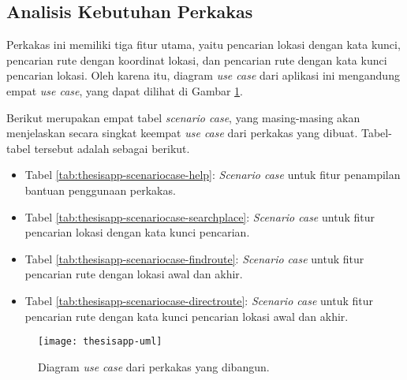 \subsection{Analisis Kebutuhan Perkakas}
\label{sec:analysis-thesisapp-usecases}

Perkakas \cl\xspace ini memiliki tiga fitur utama, yaitu pencarian lokasi dengan kata kunci, pencarian rute dengan koordinat \latlon\xspace lokasi, dan pencarian rute dengan kata kunci pencarian lokasi. Oleh karena itu, diagram \textit{use case} dari aplikasi ini mengandung empat \textit{use case}, yang dapat dilihat di Gambar \ref{fig:thesisapp-uml}. 

Berikut merupakan empat tabel \textit{scenario case}, yang masing-masing akan menjelaskan secara singkat keempat \textit{use case} dari perkakas yang dibuat. Tabel-tabel tersebut adalah sebagai berikut.

\begin{itemize}
	\item Tabel \ref{tab:thesisapp-scenariocase-help}: \textit{Scenario case} untuk fitur penampilan bantuan penggunaan perkakas.
	\item Tabel \ref{tab:thesisapp-scenariocase-searchplace}: \textit{Scenario case} untuk fitur pencarian lokasi dengan kata kunci pencarian.
	\item Tabel \ref{tab:thesisapp-scenariocase-findroute}: \textit{Scenario case} untuk fitur pencarian rute dengan \latlon\xspace lokasi awal dan akhir.
	\item Tabel \ref{tab:thesisapp-scenariocase-directroute}: \textit{Scenario case} untuk fitur pencarian rute dengan kata kunci pencarian lokasi awal dan akhir.
\end{itemize}

\begin{figure}[H]
    \centering
    \texttt{[image: thesisapp-uml]}
    \caption[Diagram \textit{use case} perkakas yang dibangun]{Diagram \textit{use case} dari perkakas yang dibangun.}
    \label{fig:thesisapp-uml}
\end{figure}


